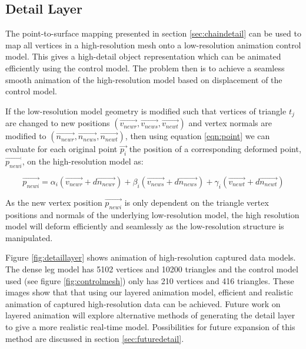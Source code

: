 \documentclass[10pt,oneside,fleqn,a4paper]{book}
\begin{document}
\subsection{\label{sec:chaindetailanim}Detail Layer}
The point-to-surface mapping presented in section \ref{sec:chaindetail} can be used to map all vertices in a high-resolution mesh onto a low-resolution animation control model. This gives a high-detail object representation which can be animated efficiently using the control model. The problem then is to achieve a seamless smooth animation of the high-resolution model based on displacement of the control model.

If the low-resolution model geometry is modified such that vertices of triangle $t_j$ are changed to new positions $(\vec{v_{newr}}, \vec{v_{news}}, \vec{v_{newt}})$ and vertex normals are modified to $(\vec{n_{newr}}, \vec{n_{news}}, \vec{n_{newt}})$, then using equation \ref{eqn:point} we can evaluate for each original point $\vec{p_i}$ the position of a corresponding deformed point, $\vec{p_{newi}}$, on the high-resolution model as:

\begin{equation} \label{eqn:rebuilddetail}
\vec{p_{newi}} = \alpha_i(\vec{v_{newr}} + d \vec{n_{newr}}) + \beta_i(\vec{v_{news}} + d \vec{n_{news}}) + \gamma_i(\vec{v_{newt}} + d \vec{n_{newt}})
\end{equation}

As the new vertex position $\vec{p_{newi}}$ is only dependent on the triangle vertex positions and normals of the underlying low-resolution model, the high resolution model will deform efficiently and seamlessly as the low-resolution structure is manipulated.

Figure \ref{fig:detaillayer} shows animation of high-resolution captured data models. The dense leg model has 5102 vertices and 10200 triangles and the control model used (see figure \ref{fig:controlmesh}) only has 210 vertices and 416 triangles. These images show that that using our layered animation model, efficient and realistic animation of captured high-resolution data can be achieved. Future work on layered animation will explore alternative methods of generating the detail layer to give a more realistic real-time model. Possibilities for future expansion of this method are discussed in section \ref{sec:futuredetail}.
\end{document}
